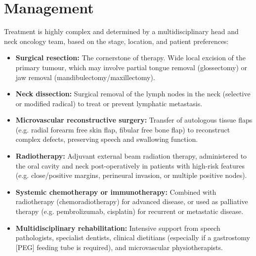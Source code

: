 \section*{Management}
Treatment is highly complex and determined by a multidisciplinary head and neck oncology team, based on the stage, location, and patient preferences:
\begin{itemize}
    \item \textbf{Surgical resection:} The cornerstone of therapy. Wide local excision of the primary tumour, which may involve partial tongue removal (glossectomy) or jaw removal (mandibulectomy/maxillectomy).
    \item \textbf{Neck dissection:} Surgical removal of the lymph nodes in the neck (selective or modified radical) to treat or prevent lymphatic metastasis.
    \item \textbf{Microvascular reconstructive surgery:} Transfer of autologous tissue flaps (e.g. radial forearm free skin flap, fibular free bone flap) to reconstruct complex defects, preserving speech and swallowing function.
    \item \textbf{Radiotherapy:} Adjuvant external beam radiation therapy, administered to the oral cavity and neck post-operatively in patients with high-risk features (e.g. close/positive margins, perineural invasion, or multiple positive nodes).
    \item \textbf{Systemic chemotherapy or immunotherapy:} Combined with radiotherapy (chemoradiotherapy) for advanced disease, or used as palliative therapy (e.g. pembrolizumab, cisplatin) for recurrent or metastatic disease.
    \item \textbf{Multidisciplinary rehabilitation:} Intensive support from speech pathologists, specialist dentists, clinical dietitians (especially if a gastrostomy [PEG] feeding tube is required), and microvascular physiotherapists.
\end{itemize}

